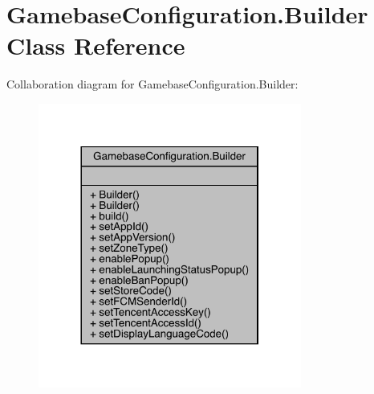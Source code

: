 \hypertarget{classcom_1_1toast_1_1android_1_1gamebase_1_1_gamebase_configuration_1_1_builder}{}\section{Gamebase\+Configuration.\+Builder Class Reference}
\label{classcom_1_1toast_1_1android_1_1gamebase_1_1_gamebase_configuration_1_1_builder}


Collaboration diagram for Gamebase\+Configuration.\+Builder\+:\nopagebreak
\begin{figure}[H]
\begin{center}
\leavevmode
\includegraphics[width=245pt]{classcom_1_1toast_1_1android_1_1gamebase_1_1_gamebase_configuration_1_1_builder__coll__graph}
\end{center}
\end{figure}
